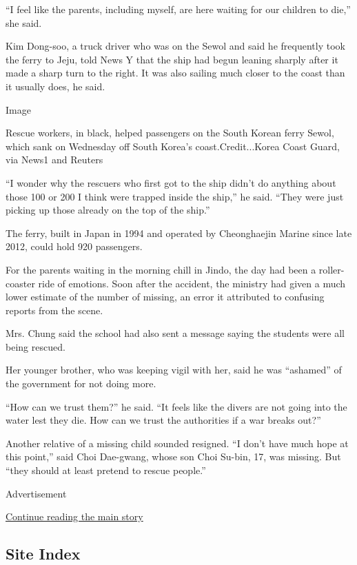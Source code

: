 ``I feel like the parents, including myself, are here waiting for our
children to die,'' she said.

Kim Dong-soo, a truck driver who was on the Sewol and said he frequently
took the ferry to Jeju, told News Y that the ship had begun leaning
sharply after it made a sharp turn to the right. It was also sailing
much closer to the coast than it usually does, he said.

Image

Rescue workers, in black, helped passengers on the South Korean ferry
Sewol, which sank on Wednesday off South Korea's coast.Credit...Korea
Coast Guard, via News1 and Reuters

``I wonder why the rescuers who first got to the ship didn't do anything
about those 100 or 200 I think were trapped inside the ship,'' he said.
``They were just picking up those already on the top of the ship.''

The ferry, built in Japan in 1994 and operated by Cheonghaejin Marine
since late 2012, could hold 920 passengers.

For the parents waiting in the morning chill in Jindo, the day had been
a roller-coaster ride of emotions. Soon after the accident, the ministry
had given a much lower estimate of the number of missing, an error it
attributed to confusing reports from the scene.

Mrs. Chung said the school had also sent a message saying the students
were all being rescued.

Her younger brother, who was keeping vigil with her, said he was
``ashamed'' of the government for not doing more.

``How can we trust them?'' he said. ``It feels like the divers are not
going into the water lest they die. How can we trust the authorities if
a war breaks out?''

Another relative of a missing child sounded resigned. ``I don't have
much hope at this point,'' said Choi Dae-gwang, whose son Choi Su-bin,
17, was missing. But ``they should at least pretend to rescue people.''

Advertisement

\protect\hyperlink{after-bottom}{Continue reading the main story}

\hypertarget{site-index}{%
\subsection{Site Index}\label{site-index}}

